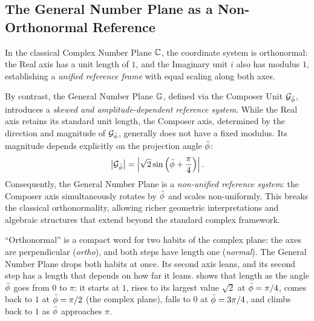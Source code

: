 \subsection{The General Number Plane as a Non-Orthonormal Reference}\label{subsubsec:non-orthonormal}

\begin{definition}\label{def:non-unified}
In the classical Complex Number Plane $\mathbb{C}$, the coordinate system is orthonormal: the Real axis has a unit length of $1$, and the Imaginary unit $i$ also has modulus $1$, establishing a \emph{unified reference frame} with equal scaling along both axes.

By contrast, the General Number Plane $\mathbb{G}$, defined via the Composer Unit $\mathcal{G}_{\bar{\phi}}$, introduces a \emph{skewed and amplitude-dependent reference system}. While the Real axis retains its standard unit length, the Composer axis, determined by the direction and magnitude of $\mathcal{G}_{\bar{\phi}}$, generally does not have a fixed modulus. Its magnitude depends explicitly on the projection angle $\bar{\phi}$:
\[
\left|\mathcal{G}_{\bar{\phi}}\right| = \left| \sqrt{2}\sin\left(\bar{\phi} + \frac{\pi}{4}\right) \right| .
\]
Consequently, the General Number Plane is a \emph{non-unified reference system}: the Composer axis simultaneously rotates by $\bar{\phi}$ and scales non-uniformly. This breaks the classical orthonormality, allowing richer geometric interpretations and algebraic structures that extend beyond the standard complex framework.
\end{definition}

\begin{plainwords}
``Orthonormal'' is a compact word for two habits of the complex plane: the axes are perpendicular (\emph{ortho}), and both steps have length one (\emph{normal}). The General Number Plane drops both habits at once. Its second axis leans, and its second step has a length that depends on how far it leans.  shows that length as the angle $\bar{\phi}$ goes from $0$ to $\pi$: it starts at $1$, rises to its largest value $\sqrt{2}$ at $\bar{\phi} = \pi/4$, comes back to $1$ at $\bar{\phi} = \pi/2$ (the complex plane), falls to $0$ at $\bar{\phi} = 3\pi/4$, and climbs back to $1$ as $\bar{\phi}$ approaches $\pi$.
\end{plainwords}

